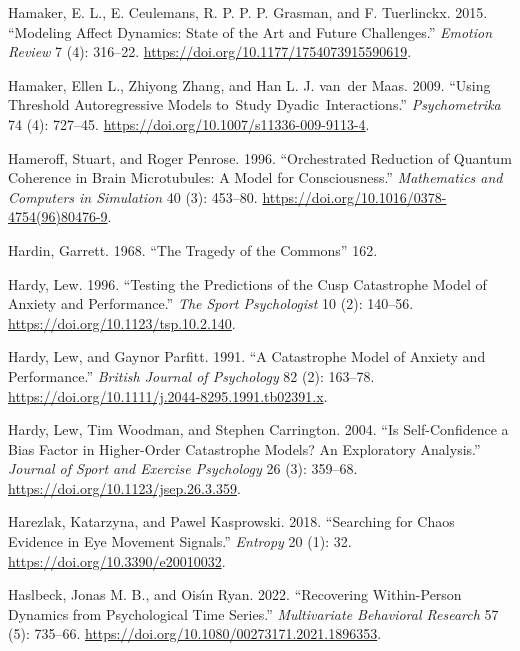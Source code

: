 \documentclass[
  a4paper,
  DIV=11,
  numbers=noendperiod,
  oneside]{scrreprt}
\newlength{\cslhangindent}
\newenvironment{CSLReferences}[2] %
 {\begin{list}{}{%
  \setlength{\itemindent}{0pt}
  \setlength{\leftmargin}{0pt}
  \setlength{\parsep}{0pt}
  \ifodd #1
   \setlength{\leftmargin}{\cslhangindent}
   \setlength{\itemindent}{-1\cslhangindent}
  \fi
  \setlength{\itemsep}{#2\baselineskip}}}
 {\end{list}}
\begin{document}
\begin{CSLReferences}{1}{0}
Hamaker, E. L., E. Ceulemans, R. P. P. P. Grasman, and F. Tuerlinckx.
2015. {``Modeling {Affect Dynamics}: {State} of the {Art} and {Future
Challenges}.''} \emph{Emotion Review} 7 (4): 316--22.
\url{https://doi.org/10.1177/1754073915590619}.

Hamaker, Ellen L., Zhiyong Zhang, and Han L. J. van~der Maas. 2009.
{``Using Threshold Autoregressive Models to~Study
Dyadic~Interactions.''} \emph{Psychometrika} 74 (4): 727--45.
\url{https://doi.org/10.1007/s11336-009-9113-4}.

Hameroff, Stuart, and Roger Penrose. 1996. {``Orchestrated Reduction of
Quantum Coherence in Brain Microtubules: {A} Model for Consciousness.''}
\emph{Mathematics and Computers in Simulation} 40 (3): 453--80.
\url{https://doi.org/10.1016/0378-4754(96)80476-9}.

Hardin, Garrett. 1968. {``The {Tragedy} of the {Commons}''} 162.

Hardy, Lew. 1996. {``Testing the {Predictions} of the {Cusp Catastrophe
Model} of {Anxiety} and {Performance}.''} \emph{The Sport Psychologist}
10 (2): 140--56. \url{https://doi.org/10.1123/tsp.10.2.140}.

Hardy, Lew, and Gaynor Parfitt. 1991. {``A Catastrophe Model of Anxiety
and Performance.''} \emph{British Journal of Psychology} 82 (2):
163--78. \url{https://doi.org/10.1111/j.2044-8295.1991.tb02391.x}.

Hardy, Lew, Tim Woodman, and Stephen Carrington. 2004. {``Is
Self-Confidence a Bias Factor in Higher-Order Catastrophe Models? An
Exploratory Analysis.''} \emph{Journal of Sport and Exercise Psychology}
26 (3): 359--68. \url{https://doi.org/10.1123/jsep.26.3.359}.

Harezlak, Katarzyna, and Pawel Kasprowski. 2018. {``Searching for Chaos
Evidence in Eye Movement Signals.''} \emph{Entropy} 20 (1): 32.
\url{https://doi.org/10.3390/e20010032}.

Haslbeck, Jonas M. B., and Oisı́n Ryan. 2022. {``Recovering
{Within-Person Dynamics} from {Psychological Time Series}.''}
\emph{Multivariate Behavioral Research} 57 (5): 735--66.
\url{https://doi.org/10.1080/00273171.2021.1896353}.


\end{CSLReferences}
\end{document}
